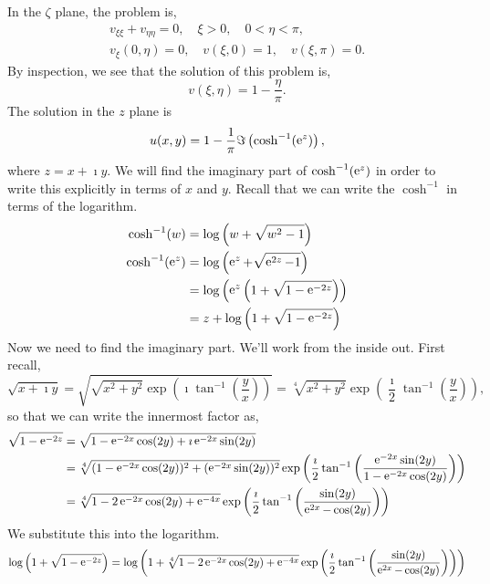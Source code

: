 {\begin{Solution}
  In the $\zeta$ plane, the problem is,
  \begin{gather*}
    v_{\xi\xi} + v_{\eta\eta} = 0, \quad \xi > 0, \quad 0 < \eta < \pi, \\
    v_\xi(0, \eta) = 0, \quad v(\xi, 0) = 1, \quad v(\xi, \pi) = 0.
  \end{gather*}
  By inspection, we see that the solution of this problem is,
  \[
  \boxed{
    v(\xi,\eta) = 1 - \frac{\eta}{\pi}.
    }
  \]
  The solution in the $z$ plane is
  \[
  u(x,y) = 1 - \frac{1}{\pi} \Im \left( \cosh^{-1} (\mathop{\mathrm{e}}\nolimits^z) \right),
  \]
  where $z = x + \imath y$.  We will find the imaginary part of 
  $\cosh^{-1}(\mathop{\mathrm{e}}\nolimits^z)$ in order to write this explicitly in terms of $x$ and $y$.
  Recall that we can write the $\cosh^{-1}$ in terms of the logarithm.
  \begin{align*}
    \cosh^{-1}(w) &= \log \left( w + \sqrt{ w^2 - 1 } \right) \\
    \cosh^{-1}(\mathop{\mathrm{e}}\nolimits^z) &= \log \left( \mathop{\mathrm{e}}\nolimits^z + \sqrt{ \mathop{\mathrm{e}}\nolimits^{2z} - 1 } \right) \\
    &= \log \left( \mathop{\mathrm{e}}\nolimits^z \left( 1 + \sqrt{ 1 - \mathop{\mathrm{e}}\nolimits^{-2z} } \right) \right) \\
    &= z + \log \left( 1 + \sqrt{ 1 - \mathop{\mathrm{e}}\nolimits^{-2z} } \right) 
  \end{align*}
  Now we need to find the imaginary part.  We'll work from the inside out.
  First recall,
  \[
  \sqrt{x + \imath y} = \sqrt{ \sqrt{x^2 + y^2} \exp \left( \imath \tan^{-1} 
      \left( \frac{y}{x} \right) \right) }
  = \sqrt[4]{ x^2 + y^2 } \exp \left( \frac{\imath}{2} \tan^{-1}
    \left( \frac{y}{x} \right) \right),
  \]
  so that we can write the innermost factor as,
  \begin{align*}
    \sqrt{1 - \mathop{\mathrm{e}}\nolimits^{-2 z} }
    &= \sqrt{ 1 - \mathop{\mathrm{e}}\nolimits^{-2 x} \cos(2 y) + \imath \mathop{\mathrm{e}}\nolimits^{-2 x} \sin(2 y) } \\
    &= \sqrt[4]{ (1 - \mathop{\mathrm{e}}\nolimits^{-2 x} \cos(2 y))^2 + (\mathop{\mathrm{e}}\nolimits^{-2 x} \sin(2 y))^2 }
    \exp \left( \frac{\imath}{2} \tan^{-1} \left(
        \frac{ \mathop{\mathrm{e}}\nolimits^{-2 x} \sin(2 y) }{ 1 - \mathop{\mathrm{e}}\nolimits^{-2 x} \cos(2 y) } \right)
    \right) \\
    &= \sqrt[4]{ 1 - 2 \mathop{\mathrm{e}}\nolimits^{-2 x} \cos(2 y) + \mathop{\mathrm{e}}\nolimits^{-4 x} }
    \exp \left( \frac{\imath}{2} \tan^{-1} \left(
        \frac{ \sin(2 y) }{ \mathop{\mathrm{e}}\nolimits^{2x} - \cos(2 y) } \right) \right) 
  \end{align*}
  We substitute this into the logarithm.
  \[
  \log \left( 1 + \sqrt{ 1 - \mathop{\mathrm{e}}\nolimits^{-2 z} } \right) = 
  \log \left( 1 + \sqrt[4]{ 1 - 2 \mathop{\mathrm{e}}\nolimits^{-2 x} \cos(2 y) + \mathop{\mathrm{e}}\nolimits^{-4 x} }
    \exp \left( \frac{\imath}{2} \tan^{-1} \left(
        \frac{ \sin(2 y) }{ \mathop{\mathrm{e}}\nolimits^{2x} - \cos(2 y) } \right) \right) \right)
\]
\end{Solution}}
